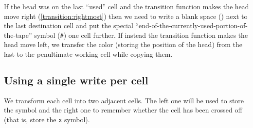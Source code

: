 \documentclass{article}
\newcommand{\0}{\texttt{\textvisiblespace}}
\newcommand{\°}{\obullet{\0}}
\newcommand{\X}{\texttt{x}}
\newcommand{\e}{\texttt{\#}}
\begin{document}
If the head was on the last ``used'' cell and the transition function makes
the head move right (\ref{transition:rightmost}) then we need to write a blank space (\°{}) next to the
last destination
cell and put the special
``end-of-the-currently-used-portion-of-the-tape'' symbol (\e)
one cell further. If instead the transition function makes the head move left,
we transfer the color (storing the position of the head) from the last
to the penultimate working cell while copying them.

\subsection{Using a single write per cell}

We transform each cell into two adjacent cells. The left one will be used to
store the symbol and the right one to remember whether the cell has been
crossed off (that is, store the \X{} symbol).
\end{document}
